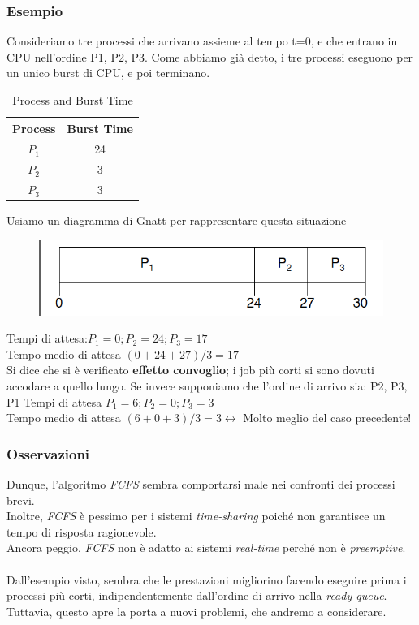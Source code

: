 \subsubsection{Esempio}
Consideriamo tre processi che arrivano assieme al tempo t=0, e che entrano in CPU nell’ordine P1, P2, P3.
Come abbiamo già detto, i tre processi eseguono per un unico burst di CPU, e poi terminano.
\begin{table}[h]
    \centering
    \begin{tabular}{|c|c|}
        \hline
        \textbf{Process} & \textbf{Burst Time} \\
        \hline
        $P_1$ & 24 \\
        $P_2$ & 3 \\
        $P_3$ & 3 \\
        \hline
    \end{tabular}
    \caption{Process and Burst Time}
    \label{tab:process_burst_time}
\end{table}

Usiamo un diagramma di Gnatt per rappresentare questa situazione
\begin{figure}[h]
    \centering
    \includegraphics[width=0.5\linewidth]{images/FCFS_gnatt.png}
\end{figure}
Tempi di attesa:$P_1 = 0;P_2 = 24;P_3 = 17$\\
Tempo medio di attesa $(0+24+27)/3 = 17$\\
Si dice che si è verificato \textbf{effetto convoglio}; i job più corti si sono dovuti accodare a quello lungo.
\bigskip
Se invece supponiamo che l'ordine di arrivo sia: P2, P3, P1
Tempi di attesa $P_1 = 6; P_2 = 0; P_3 = 3$\\
Tempo medio di attesa $(6+0+3)/3 = 3 \longleftrightarrow$ Molto meglio del caso precedente!\\

\subsubsection{Osservazioni}
Dunque, l'algoritmo \textit{FCFS} sembra comportarsi male nei confronti dei processi brevi. \\
Inoltre, \textit{FCFS} è pessimo per i sistemi \textit{time-sharing} poiché non garantisce un tempo di risposta ragionevole.\\
Ancora peggio, \textit{FCFS} non è adatto ai sistemi \textit{real-time} perché non è \textit{preemptive}.\\\\
Dall’esempio visto, sembra che le prestazioni migliorino facendo eseguire prima i processi più corti, indipendentemente dall’ordine di arrivo nella \textit{ready queue}. Tuttavia, questo apre la porta a nuovi problemi, che andremo a considerare.

